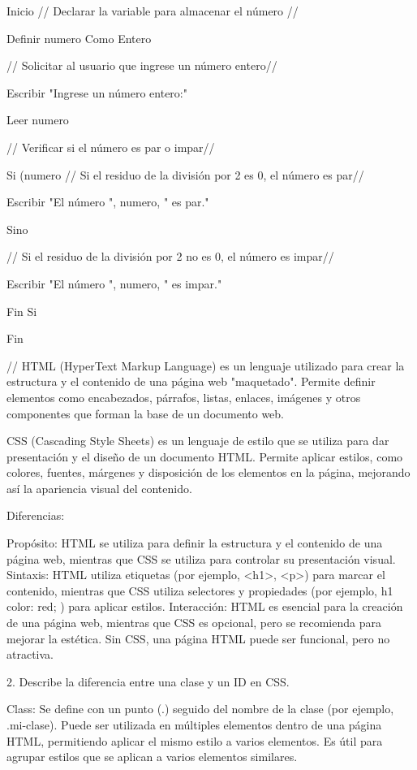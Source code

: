 Inicio
    // Declarar la variable para almacenar el número //
    
    Definir numero Como Entero

    // Solicitar al usuario que ingrese un número entero//
    
    Escribir "Ingrese un número entero:"
    
    Leer numero

    // Verificar si el número es par o impar//
    
    Si (numero %
        // Si el residuo de la división por 2 es 0, el número es par//
        
        Escribir "El número ", numero, " es par."
        
    Sino
    
        // Si el residuo de la división por 2 no es 0, el número es impar//
        
        Escribir "El número ", numero, " es impar."
        
    Fin Si
    
Fin


//
HTML (HyperText Markup Language) es un lenguaje utilizado para crear la estructura y el contenido de una página web  "maquetado". Permite definir elementos como encabezados, párrafos, listas, enlaces, imágenes y otros componentes que forman la base de un documento web.

CSS (Cascading Style Sheets) es un lenguaje de estilo que se utiliza para dar presentación y el diseño de un documento HTML. Permite aplicar estilos, como colores, fuentes, márgenes y disposición de los elementos en la página, mejorando así la apariencia visual del contenido.

Diferencias:

Propósito: HTML se utiliza para definir la estructura y el contenido de una página web, mientras que CSS se utiliza para controlar su presentación visual.
Sintaxis: HTML utiliza etiquetas (por ejemplo, <h1>, <p>) para marcar el contenido, mientras que CSS utiliza selectores y propiedades (por ejemplo, h1 { color: red; }) para aplicar estilos.
Interacción: HTML es esencial para la creación de una página web, mientras que CSS es opcional, pero se recomienda para mejorar la estética. Sin CSS, una página HTML puede ser funcional, pero no atractiva.

2. Describe la diferencia entre una clase y un ID en CSS.

Class: Se define con un punto (.) seguido del nombre de la clase (por ejemplo, .mi-clase).
Puede ser utilizada en múltiples elementos dentro de una página HTML, permitiendo aplicar el mismo estilo a varios elementos.
Es útil para agrupar estilos que se aplican a varios elementos similares.

